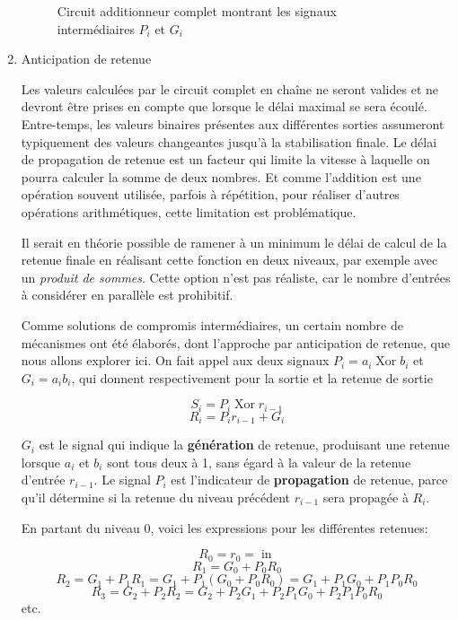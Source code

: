 \documentclass[letter, oneside]{book}
\begin{document}
\begin{enumerate}
\begin{figure}[htbp]
\centering

\caption{\label{fig:org10698c1}Circuit additionneur complet montrant les signaux intermédiaires \(P_i\) et \(G_i\)}
\end{figure}

\item Anticipation de retenue
\label{sec:orgdff1606}

Les valeurs calculées par le circuit complet en chaîne ne seront
valides et ne devront être prises en compte que lorsque le délai
maximal se sera écoulé. Entre-temps, les valeurs binaires présentes
aux différentes sorties assumeront typiquement des valeurs changeantes
jusqu'à la stabilisation finale. Le délai de propagation de retenue est
un facteur qui limite la vitesse à laquelle on pourra calculer la
somme de deux nombres. Et comme l'addition est une opération 
souvent utilisée, parfois à répétition, pour réaliser d'autres
opérations arithmétiques, cette limitation est problématique. 

Il serait en théorie possible de ramener à un minimum le délai de
calcul de la retenue finale en réalisant cette fonction en deux
niveaux, par exemple avec un \emph{produit de sommes}. Cette option n'est pas
réaliste, car le nombre d'entrées à considérer en parallèle est prohibitif.

Comme solutions de compromis intermédiaires, un certain nombre de
mécanismes ont été élaborés, dont l'approche par anticipation de
retenue, que nous allons explorer ici. On fait appel aux deux signaux
\(P_i = a_i \operatorname{Xor} b_i\) et \(G_i = a_i b_i\), qui donnent
respectivement pour la sortie et la retenue de sortie

$$ S_i = P_i \operatorname{Xor} r_{i-1} $$
$$ R_i = P_i r_{i-1} + G_i $$

\(G_i\) est le signal qui indique la \textbf{génération} de retenue,
produisant une retenue lorsque \(a_i\) et \(b_i\) sont tous deux à 1,
sans égard à la valeur de la retenue d'entrée \(r_{i-1}\). Le signal
\(P_i\) est l'indicateur de \textbf{propagation} de retenue, parce qu'il
détermine si la retenue du niveau précédent \(r_{i-1}\) sera propagée
à \(R_i\).

En partant du niveau 0, voici les expressions pour les différentes retenues:

$$ R_0 = r_0 = \operatorname{in}$$
$$ R_1 = G_0 + P_0 R_0 $$
$$ R_2 = G_1 + P_1 R_1 = G_1 + P_1 (G_0 + P_0 R_0) = G_1 + P_1 G_0 + P_1 P_0 R_0 $$
$$ R_3 = G_2 + P_2 R_2 = G_2 + P_2 G_1 + P_2 P_1 G_0 + P_2 P_1 P_0 R_0 $$
etc.


\end{enumerate}
\end{document}

